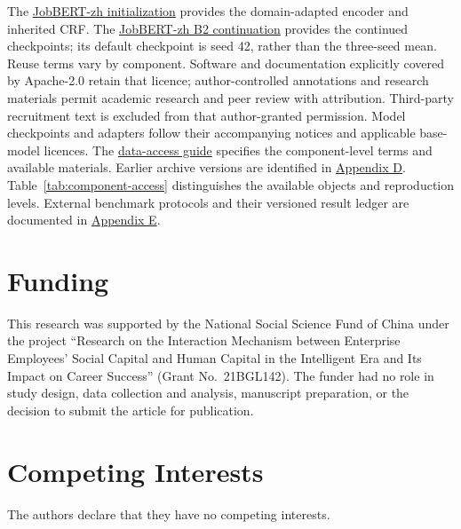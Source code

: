 \documentclass[fleqn,12pt,lineno]{wlpeerj}
\begin{document}
\begin{sloppypar}
The \href{https://huggingface.co/AlfredJames/jobbert-zh}{JobBERT-zh initialization} provides the domain-adapted encoder and inherited CRF. The \href{https://huggingface.co/AlfredJames/jobbert-zh-v6a}{JobBERT-zh B2 continuation} provides the continued checkpoints; its default checkpoint is seed 42, rather than the three-seed mean. Reuse terms vary by component. Software and documentation explicitly covered by Apache-2.0 retain that licence; author-controlled annotations and research materials permit academic research and peer review with attribution. Third-party recruitment text is excluded from that author-granted permission. Model checkpoints and adapters follow their accompanying notices and applicable base-model licences. The \href{https://github.com/AlfredJamesLi/chinese-skillspan-benchmark/blob/main/DATA_AVAILABILITY.md}{data-access guide} specifies the component-level terms and available materials. Earlier archive versions are identified in \hyperref[app:d]{Appendix D}. Table~\ref{tab:component-access} distinguishes the available objects and reproduction levels. External benchmark protocols and their versioned result ledger are documented in \hyperref[app:e]{Appendix E}.
\end{sloppypar}



\FloatBarrier

\section{Funding}
This research was supported by the National Social Science Fund of China under
the project ``Research on the Interaction Mechanism between Enterprise Employees'
Social Capital and Human Capital in the Intelligent Era and Its Impact on Career
Success'' (Grant No.~21BGL142).
The funder had no role in study design, data collection and analysis, manuscript preparation, or the decision to submit the article for publication.

\section{Competing Interests}
The authors declare that they have no competing interests.
\end{document}
